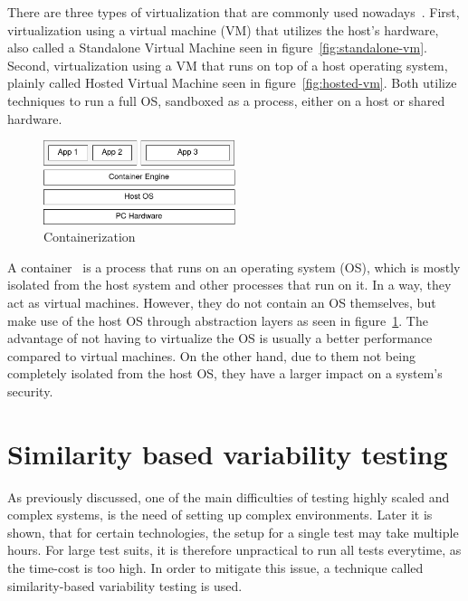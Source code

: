 There are three types of virtualization that are commonly used nowadays~\cite{containers-vs-virtual-machines, a-survey-on-virtualization-technologies}.
First, virtualization using a virtual machine (VM) that utilizes the host's hardware, also called a Standalone Virtual Machine seen in figure~\ref{fig:standalone-vm}.
Second, virtualization using a VM that runs on top of a host operating system, plainly called Hosted Virtual Machine seen in figure~\ref{fig:hosted-vm}.
Both utilize techniques to run a full OS, sandboxed as a process, either on a host or shared hardware.

\begin{figure}[H]
    \centering
    \includegraphics[width=0.5\textwidth]{img/background/container}
    \caption{Containerization}
    \label{fig:containerization}
\end{figure}

A container~\cite{what-are-linux-containers} is a process that runs on an operating system (OS), which is mostly isolated from the host system and other processes that run on it.
In a way, they act as virtual machines.
However, they do not contain an OS themselves, but make use of the host OS through abstraction layers as seen in figure~\ref{fig:containerization}.
The advantage of not having to virtualize the OS is usually a better performance compared to virtual machines.
On the other hand, due to them not being completely isolated from the host OS, they have a larger impact on a system's security.



\section{Similarity based variability testing}\label{sec:similarities}

As previously discussed, one of the main difficulties of testing highly scaled and complex systems, is the need of setting up complex environments.
Later it is shown, that for certain technologies, the setup for a single test may take multiple hours.
For large test suits, it is therefore unpractical to run all tests everytime, as the time-cost is too high.
In order to mitigate this issue, a technique called similarity-based variability testing is used.

